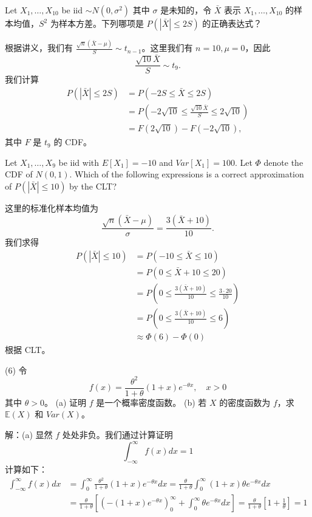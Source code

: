 \begin{questions}
\question Let $X_1, \dots, X_{10}$ be iid $\sim N(0, \sigma^2)$ 其中 $\sigma$ 是未知的，令 $\bar{X}$ 表示 $X_1, \dots, X_{10}$ 的样本均值，$S^2$ 为样本方差。下列哪项是 $P(|\bar{X}| \le 2S)$ 的正确表达式？

\begin{solution}
根据讲义，我们有 $\frac{\sqrt{n}(\bar{X} - \mu)}{S} \sim t_{n-1}$。这里我们有 $n = 10, \mu = 0$，因此
\[
\frac{\sqrt{10} \bar{X}}{S} \sim t_9.
\]
我们计算
\begin{align*}
P(|\bar{X}| \le 2S) &= P(-2S \le \bar{X} \le 2S) \\
&= P\left(-2\sqrt{10} \le \frac{\sqrt{10} \bar{X}}{S} \le 2\sqrt{10}\right) \\
&= F(2\sqrt{10}) - F(-2\sqrt{10}),
\end{align*}
其中 $F$ 是 $t_9$ 的 CDF。
\end{solution}

\question Let $X_1, \dots, X_9$ be iid with $E[X_1] = -10$ and $Var[X_1] = 100$. Let $\Phi$ denote the CDF of $N(0, 1)$. Which of the following expressions is a correct approximation of $P(|\bar{X}| \le 10)$ by the CLT?

\begin{solution}
这里的标准化样本均值为
\[
\frac{\sqrt{n}(\bar{X} - \mu)}{\sigma} = \frac{3(\bar{X} + 10)}{10}.
\]
我们求得
\begin{align*}
P(|\bar{X}| \le 10) &= P(-10 \le \bar{X} \le 10) \\
&= P(0 \le \bar{X} + 10 \le 20) \\
&= P\left(0 \le \frac{3(\bar{X} + 10)}{10} \le \frac{3 \cdot 20}{10}\right) \\
&= P\left(0 \le \frac{3(\bar{X} + 10)}{10} \le 6\right) \\
&\approx \Phi(6) - \Phi(0)
\end{align*}
根据 CLT。
\end{solution}

\question (6) 令
\[
f(x) = \frac{\theta^2}{1 + \theta}(1 + x)e^{-\theta x}, \quad x > 0
\]
其中 $\theta > 0$。
(a) 证明 $f$ 是一个概率密度函数。
(b) 若 $X$ 的密度函数为 $f$，求 $\mathbb{E}(X)$ 和 $Var(X)$。

\begin{solution}
解：(a) 显然 $f$ 处处非负。我们通过计算证明
\[
\int_{-\infty}^{\infty} f(x) dx = 1
\]
计算如下：
\begin{align*}
\int_{-\infty}^{\infty} f(x) dx &= \int_{0}^{\infty} \frac{\theta^2}{1 + \theta}(1 + x)e^{-\theta x} dx = \frac{\theta}{1 + \theta} \int_{0}^{\infty} (1 + x)\theta e^{-\theta x} dx \\
&= \frac{\theta}{1 + \theta} \left[ \left( -(1 + x)e^{-\theta x} \right)_{0}^{\infty} + \int_{0}^{\infty} \theta e^{-\theta x} dx \right] = \frac{\theta}{1 + \theta} \left[ 1 + \frac{1}{\theta} \right] = 1
\end{align*}


\end{solution}
\end{questions}

